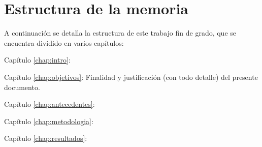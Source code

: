 \section{Estructura de la memoria}
A continuación se detalla la estructura de este trabajo fin de grado, que se encuentra dividido en varios capítulos:

\begin{definitionlist}	
	\item[Capítulo \ref{chap:intro}: \nameref{chap:intro}]
	
	\item[Capítulo \ref{chap:objetivos}: \nameref{chap:objetivos}]
	Finalidad y justificación (con todo detalle) del presente documento.
	
	\item[Capítulo \ref{chap:antecedentes}: \nameref{chap:antecedentes}]
	
	\item[Capítulo \ref{chap:metodologia}: \nameref{chap:metodologia}]
	
	\item[Capítulo \ref{chap:resultados}: \nameref{chap:resultados}]
\end{definitionlist}

